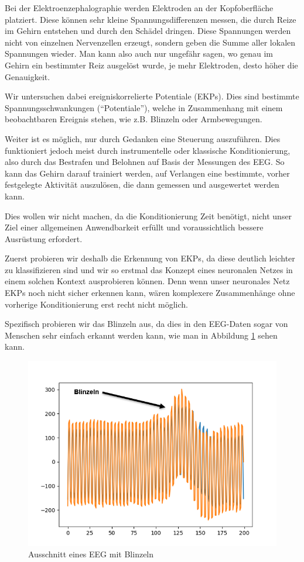 \documentclass{scrartcl}
\begin{document}
	Bei der Elektroenzephalographie werden Elektroden an der Kopfoberfläche platziert. Diese können sehr kleine Spannungsdifferenzen messen, die durch Reize im Gehirn entstehen und durch den Schädel dringen. Diese Spannungen werden nicht von einzelnen Nervenzellen erzeugt, sondern geben die Summe aller lokalen Spannungen wieder. Man kann also auch nur ungefähr sagen, wo genau im Gehirn ein bestimmter Reiz ausgelöst wurde, je mehr Elektroden, desto höher die Genauigkeit. \cite{wiki:Elektroenzephalografie}

	Wir untersuchen dabei ereigniskorrelierte Potentiale (EKPs). Dies sind bestimmte Spannungsschwankungen (\enquote{Potentiale}), welche in Zusammenhang mit einem beobachtbaren Ereignis stehen, wie z.B. Blinzeln oder Armbewegungen. \cite{Birbaumer2010} \cite{Praktikum}

	Weiter ist es möglich, nur durch Gedanken eine Steuerung auszuführen. Dies funktioniert jedoch meist durch instrumentelle oder klassische Konditionierung, also durch das Bestrafen und Belohnen auf Basis der Messungen des EEG. So kann das Gehirn darauf trainiert werden, auf Verlangen eine bestimmte, vorher festgelegte Aktivität auszulösen, die dann gemessen und ausgewertet werden kann.  \cite{BCIChaudhary}

	Dies wollen wir nicht machen, da die Konditionierung Zeit benötigt, nicht unser Ziel einer allgemeinen Anwendbarkeit erfüllt und voraussichtlich bessere Ausrüstung erfordert.

	Zuerst probieren wir deshalb die Erkennung von EKPs, da diese deutlich leichter zu klassifizieren sind und wir so erstmal das Konzept eines neuronalen Netzes in einem solchen Kontext ausprobieren können. Denn wenn unser neuronales Netz EKPs noch nicht sicher erkennen kann, wären komplexere Zusammenhänge ohne vorherige Konditionierung erst recht nicht möglich.

	Spezifisch probieren wir das Blinzeln aus, da dies in den EEG-Daten sogar von Menschen sehr einfach erkannt werden kann, wie man in Abbildung \ref{EEG-Blinzeln} sehen kann.
	
	\begin{figure}[h]
		\includegraphics{pictures/blinzeln_ekp_beispiel_pyplot_annotated.png}
		\caption{Ausschnitt eines EEG mit Blinzeln}
		\label{EEG-Blinzeln}
	\end{figure}
\end{document}
